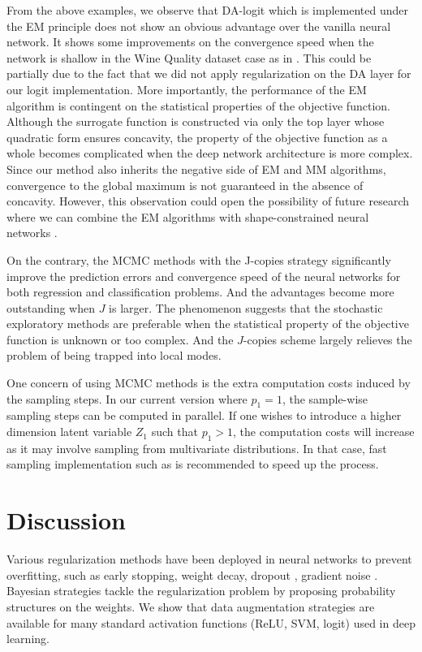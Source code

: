 \documentclass[ba]{imsart}
\numberwithin{equation}{section}
\theoremstyle{plain}
\begin{document}
From the above examples, we observe that DA-logit which is implemented under the EM principle does not show an obvious advantage over the vanilla neural network. It shows some improvements on the convergence speed when the network is shallow in the Wine Quality dataset case as in . This could be partially due to the fact that we did not apply regularization on the DA layer for our logit implementation. More importantly, the performance of the EM algorithm is contingent on the statistical properties of the objective function. Although the surrogate function is constructed via only the top layer whose quadratic form ensures concavity, the property of the objective function as a whole becomes complicated when the deep network architecture is more complex. Since our method also inherits the negative side of EM and MM algorithms, convergence to the global maximum is not guaranteed in the absence of concavity.  However,  this observation could open the possibility of future research where we can combine the EM algorithms with shape-constrained neural networks \citep{gupta2020multidimensional}.

On the contrary, the MCMC methods with the J-copies strategy significantly improve the prediction errors and convergence speed of the neural networks for both regression and classification problems. And the advantages become more outstanding when $J$ is larger. The phenomenon suggests that the stochastic exploratory methods are preferable when the statistical property of the objective function is unknown or too complex. And the $J$-copies scheme largely relieves the problem of  being trapped into local modes.

One concern of using MCMC methods is the extra computation costs induced by the sampling steps. In our current version where $p_1=1$, the sample-wise sampling steps can be computed in parallel. If one wishes to introduce a higher dimension latent variable $Z_1$ such that $p_1>1$, the computation costs will increase as it may involve sampling from multivariate distributions. In that case, fast sampling implementation such as \citet{bhattacharya2016fast} is recommended to speed up the process.

\section{Discussion}\label{sec:discussion}
Various regularization methods have been deployed in neural networks to prevent overfitting, such as early stopping, weight decay, dropout \citep{hinton2012improving}, gradient noise \citep{neelakantan2015adding}.  Bayesian strategies tackle the regularization problem by proposing probability structures on the weights. We show that  data augmentation strategies are available for many standard activation functions (ReLU, SVM, logit) used in deep learning. 
 
\end{document}
